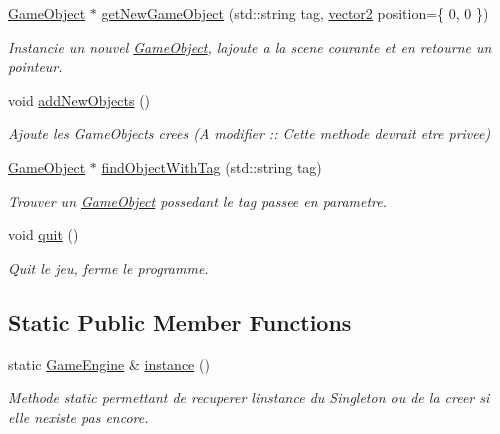 \begin{DoxyCompactItemize}
\hyperlink{class_game_object}{Game\+Object} $\ast$ \hyperlink{class_game_engine_adaaa9e4c0b2cfd2f248164a16684c700}{get\+New\+Game\+Object} (std\+::string tag, \hyperlink{structvector2}{vector2} position=\{ 0, 0 \})
\begin{DoxyCompactList}\small\item\em Instancie un nouvel \hyperlink{class_game_object}{Game\+Object}, l\textquotesingle{}ajoute a la scene courante et en retourne un pointeur. \end{DoxyCompactList}\item 
\hypertarget{class_game_engine_a93ae1a7543981d2d3d0e70b14174135f}{}\label{class_game_engine_a93ae1a7543981d2d3d0e70b14174135f} 
void \hyperlink{class_game_engine_a93ae1a7543981d2d3d0e70b14174135f}{add\+New\+Objects} ()
\begin{DoxyCompactList}\small\item\em Ajoute les Game\+Objects crees (A modifier \+:\+: Cette methode devrait etre privee) \end{DoxyCompactList}\item 
\hyperlink{class_game_object}{Game\+Object} $\ast$ \hyperlink{class_game_engine_a92a0f7ffa3e36c93b51427dcf36a2586}{find\+Object\+With\+Tag} (std\+::string tag)
\begin{DoxyCompactList}\small\item\em Trouver un \hyperlink{class_game_object}{Game\+Object} possedant le tag passee en parametre. \end{DoxyCompactList}\item 
\hypertarget{class_game_engine_ad82b626def2e52b28f0d6c2d167589f6}{}\label{class_game_engine_ad82b626def2e52b28f0d6c2d167589f6} 
void \hyperlink{class_game_engine_ad82b626def2e52b28f0d6c2d167589f6}{quit} ()
\begin{DoxyCompactList}\small\item\em Quit le jeu, ferme le programme. \end{DoxyCompactList}\end{DoxyCompactItemize}
\subsection*{Static Public Member Functions}
\begin{DoxyCompactItemize}
\item 
static \hyperlink{class_game_engine}{Game\+Engine} \& \hyperlink{class_game_engine_a5d5df5f1dabaaa1b98eeb1340f4f118d}{instance} ()
\begin{DoxyCompactList}\small\item\em Methode static permettant de recuperer l\textquotesingle{}instance du Singleton ou de la creer si elle n\textquotesingle{}existe pas encore. \end{DoxyCompactList}\end{DoxyCompactItemize}
